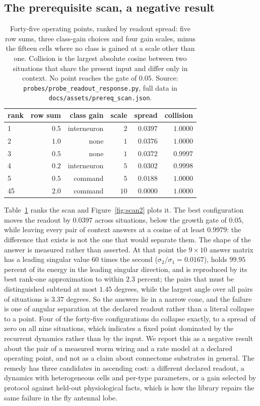 \documentclass[11pt]{article}
\theoremstyle{remark}
\begin{document}
\subsection{The prerequisite scan, a negative result}
\label{sec:scan}

\begin{table}[t]
\centering
\small
\caption{Forty-five operating points, ranked by readout spread: five row sums, three class-gain choices
and four gain scales, minus the fifteen cells where no class is gained at a scale other than one.
Collision is the largest absolute cosine between two situations that share the present input and differ
only in context. No point reaches the gate of $0.05$. Source:
\texttt{probes/probe\_readout\_response.py}, full data in \texttt{docs/assets/prereq\_scan.json}.}
\label{tab:scan2}
\begin{tabular}{lrrrrr}
\toprule
rank & row sum & class gain & scale & spread & collision \\
\midrule
1 & $0.5$ & interneuron & $2$ & $0.0397$ & $1.0000$ \\
2 & $1.0$ & none & $1$ & $0.0376$ & $1.0000$ \\
3 & $0.5$ & none & $1$ & $0.0372$ & $0.9997$ \\
4 & $0.2$ & interneuron & $5$ & $0.0302$ & $0.9998$ \\
5 & $0.5$ & command & $5$ & $0.0188$ & $1.0000$ \\
45 & $2.0$ & command & $10$ & $0.0000$ & $1.0000$ \\
\bottomrule
\end{tabular}
\end{table}

Table~\ref{tab:scan2} ranks the scan and Figure~\ref{fig:scan2} plots it. The best configuration
moves the readout by $0.0397$ across situations, below the growth gate of $0.05$,
while leaving every pair of context answers at a cosine of at least $0.9979$: the difference that exists
is not the one that would separate them. The shape of the answer is measured rather than asserted. At
that point the $9\times10$ answer matrix has a leading singular value $60$ times the second
($\sigma_2/\sigma_1 = 0.0167$), holds $99.95$ percent of its energy in the leading singular direction,
and is reproduced by its best rank-one approximation to within $2.3$ percent; the pairs that must be
distinguished subtend at most $1.45$ degrees, while the largest angle over all pairs of situations is
$3.37$ degrees. So the answers lie in a narrow cone, and the failure is one of angular separation at the
declared readout rather than a literal collapse to a point. Four of the forty-five configurations do
collapse exactly, to a spread of zero on all nine situations, which indicates a fixed point dominated by
the recurrent dynamics rather than by the input. We
report this as a negative result about the pair of a measured worm wiring and a rate model at a
declared operating point, and not as a claim about connectome substrates in general. The remedy has
three candidates in ascending cost: a different declared readout, a dynamics with heterogeneous
cells and per-type parameters, or a gain selected by protocol against held-out physiological facts,
which is how the library repairs the same failure in the fly antennal lobe.
\end{document}
